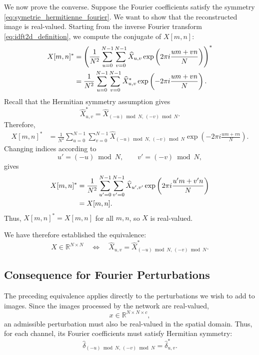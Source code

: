 We now prove the converse. Suppose the Fourier coefficients satisfy the symmetry
\eqref{eq:symetrie_hermitienne_fourier}. We want to show that the reconstructed image is real-valued.
Starting from the inverse Fourier transform \eqref{eq:idft2d_definition}, we compute the conjugate
of $X[m,n]$:
\begin{align*}
    X[m,n]^*
    &=
    \left(
        \frac{1}{N^2}
        \sum_{u=0}^{N-1}\sum_{v=0}^{N-1}
        \widehat{X}_{u,v}
        \exp\left(2\pi i\frac{um+vn}{N}\right)
    \right)^* \notag \\
    &=
    \frac{1}{N^2}
    \sum_{u=0}^{N-1}\sum_{v=0}^{N-1}
    \widehat{X}^{*}_{u,v}
    \exp\left(-2\pi i\frac{um+vn}{N}\right).
\end{align*}
Recall that the Hermitian symmetry assumption gives
\[
    \widehat{X}^{*}_{u,v}
    =
    \widehat{X}_{(-u)\bmod N,\,(-v)\bmod N}.
\]
Therefore,
\begin{align*}
    X[m,n]^*
    &=
    \frac{1}{N^2}
    \sum_{u=0}^{N-1}\sum_{v=0}^{N-1}
    \widehat{X}_{(-u)\bmod N,\,(-v)\bmod N}
    \exp\left(-2\pi i\frac{um+vn}{N}\right).
\end{align*}
Changing indices according to
\[
    u' = (-u)\bmod N,
    \qquad
    v' = (-v)\bmod N,
\]
gives
\begin{align*}
    X[m,n]^*
    &=
    \frac{1}{N^2}
    \sum_{u'=0}^{N-1}\sum_{v'=0}^{N-1}
    \widehat{X}_{u',v'}
    \exp\left(2\pi i\frac{u'm+v'n}{N}\right) \notag \\
    &=
    X[m,n].
\end{align*}
Thus, $X[m,n]^*=X[m,n]$ for all $m,n$, so $X$ is real-valued.

We have therefore established the equivalence:
\[
    X\in\mathbb{R}^{N\times N}
    \quad\Longleftrightarrow\quad
    \widehat{X}_{u,v}
    =
    \widehat{X}^{*}_{(-u)\bmod N,\,(-v)\bmod N}.
\]

\subsection{Consequence for Fourier Perturbations}

The preceding equivalence applies directly to the perturbations we wish to add to images.
Since the images processed by the network are real-valued,
\[
    x \in \mathbb{R}^{N\times N\times c},
\]
an admissible perturbation must also be real-valued in the spatial domain. Thus, for each channel,
its Fourier coefficients must satisfy Hermitian symmetry:
\begin{equation}
    \widehat{\delta}_{(-u)\bmod N,\,(-v)\bmod N}
    =
    \widehat{\delta}_{u,v}^{*}.
    \label{eq:contrainte_reelle_perturbation_fourier}
\end{equation}

